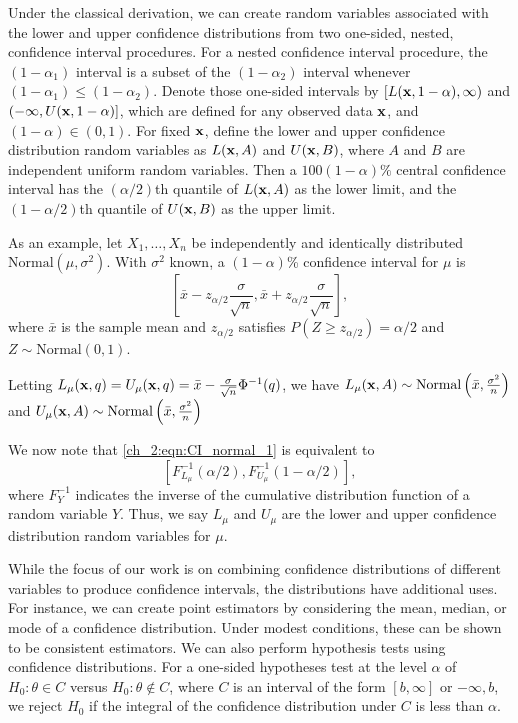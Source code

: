 Under the classical derivation, we can create random variables associated with the lower and upper confidence distributions from two one-sided, nested, confidence interval procedures.
For a nested confidence interval procedure, the $(1-\alpha_1)$ interval is a subset of the $(1-\alpha_2)$ interval whenever $(1-\alpha_1) \leq (1-\alpha_2)$.
Denote those one-sided intervals by $[L({\bf x},1-\alpha), \infty)$ and $(-\infty, U({\bf x},1-\alpha)]$, which are defined for any observed data ${\bf x}$, and $(1-\alpha) \in (0,1)$.
For fixed ${\bf x}$, define the lower and upper confidence distribution random variables as $L({\bf x}, A)$ and $U({\bf x},B)$, where $A$ and $B$ are independent uniform random variables.
Then a $100(1-\alpha)\%$ central confidence interval has the $(\alpha/2)$th quantile of $L({\bf x}, A)$ as the lower limit, and the $(1-\alpha/2)$th quantile of $U({\bf x},B)$ as the upper limit.

As an example, let \( X_1, \ldots, X_n \) be independently and identically distributed \( \textrm{Normal}(\mu, \sigma^2) \).
With \( \sigma^2 \) known, a \( (1 - \alpha) \)\% confidence interval for \( \mu \) is
\begin{equation}
\left[ \bar{x} - z_{\alpha/2} \frac{\sigma}{\sqrt{n}}, \bar{x} + z_{\alpha/2} \frac{\sigma}{\sqrt{n}} \right],
\label{ch_2:eqn:CI_normal_1}
\end{equation}
where \( \bar{x} \) is the sample mean and \( z_{\alpha / 2} \) satisfies \( P(Z \geq z_{\alpha / 2}) = \alpha / 2 \) and \( Z \sim \textrm{Normal}(0,1) \).

Letting \( L_\mu (\mathbf{x}, q) = U_\mu (\mathbf{x}, q) = \bar{x} - \frac{\sigma}{\sqrt{n}} \Phi^{-1}(q) \), we have \( L_\mu(\mathbf{x}, A) \sim \textrm{Normal} \left( \bar{x}, \frac{\sigma^2}{n} \right) \) and \( U_\mu(\mathbf{x}, A) \sim \textrm{Normal} \left( \bar{x}, \frac{\sigma^2}{n} \right) \)

We now note that \eqref{ch_2:eqn:CI_normal_1} is equivalent to
\begin{equation}
    \left[ F_{L_{\mu}}^{-1}(\alpha / 2), F_{U_{\mu}}^{-1}(1- \alpha / 2) \right],
\end{equation}
where \( F_Y^{-1} \) indicates the inverse of the cumulative distribution function of a random variable \( Y \).
Thus, we say \( L_\mu \) and \( U_\mu \) are the lower and upper confidence distribution random variables for \( \mu \).

While the focus of our work is on combining confidence distributions of different variables to produce confidence intervals, the distributions have additional uses.
For instance, we can create point estimators by considering the mean, median, or mode of a confidence distribution.
Under modest conditions, these can be shown to be consistent estimators.
We can also perform hypothesis tests using confidence distributions.
For a one-sided hypotheses test at the level \( \alpha \) of \( H_0: \theta \in C \) versus \( H_0: \theta \notin C \), where \( C \) is an interval of the form \( [b, \infty] \) or \( -\infty, b \), we reject \( H_0 \) if the integral of the confidence distribution under \( C \) is less than \( \alpha \).

